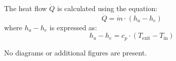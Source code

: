 The heat flow \( \dot{Q} \) is calculated using the equation:  
\[
\dot{Q} = \dot{m} \cdot (h_a - h_e)
\]  
where \( h_a - h_e \) is expressed as:  
\[
h_a - h_e = c_p \cdot (T_{\text{exit}} - T_{\text{in}})
\]  

No diagrams or additional figures are present.